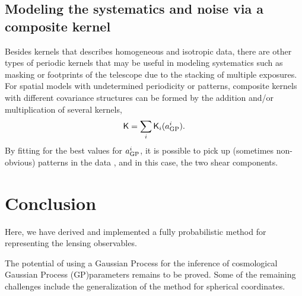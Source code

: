 \subsection{Modeling the systematics and noise via a composite kernel}
Besides kernels that describes homogeneous and isotropic data,
there are other types of periodic kernels that may be useful
in modeling systematics such as masking or footprints of the telescope due to the
stacking of multiple exposures.
For spatial models with undetermined periodicity or patterns, 
composite kernels with different covariance structures 
can be formed by the addition and/or multiplication of several kernels,
\begin{equation}
	\mathsf{K} = \sum_i \mathsf{K}_i(a_{\rm GP}^i).
\end{equation}
By fitting for the best values for $a_{\rm GP}^i$, it is possible  
to pick up (sometimes non-obvious) patterns in the data \citep{Duvenaud2013},
and in this case, the two shear components. 




\section{Conclusion}
Here, we have derived and implemented a fully probabilistic method for 
representing the lensing observables.   

The potential of using a Gaussian Process for the inference of cosmological 
Gaussian Process (GP)parameters remains to be proved. 
Some of the remaining challenges include the generalization of the method for spherical
coordinates. 


